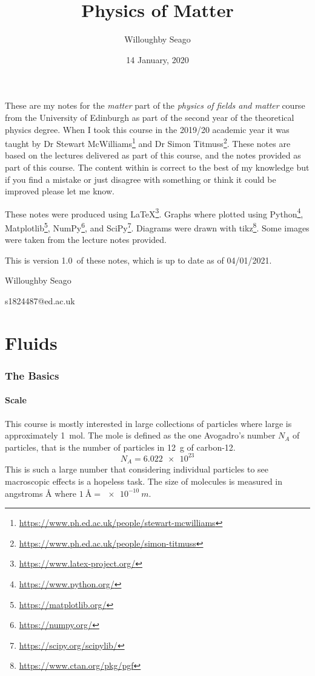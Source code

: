 \documentclass{article}
\author{Willoughby Seago}
\date{14 January, 2020}
\title{Physics of Matter}
\newcommand{\notesVersion}{1.0}
\newcommand{\notesDate}{04/01/2021}
\begin{document}
    \maketitle
    These are my notes for the \textit{matter} part of the \textit{physics of fields and matter} course from the University of Edinburgh as part of the second year of the theoretical physics degree.
    When I took this course in the 2019/20 academic year it was taught by Dr Stewart McWilliams\footnote{\url{https://www.ph.ed.ac.uk/people/stewart-mcwilliams}} and Dr Simon Titmuss\footnote{\url{https://www.ph.ed.ac.uk/people/simon-titmuss}}.
    These notes are based on the lectures delivered as part of this course, and the notes provided as part of this course.
    The content within is correct to the best of my knowledge but if you find a mistake or just disagree with something or think it could be improved please let me know.
    
    These notes were produced using \LaTeX\footnote{\url{https://www.latex-project.org/}}.
    Graphs where plotted using Python\footnote{\url{https://www.python.org/}}, Matplotlib\footnote{\url{https://matplotlib.org/}}, NumPy\footnote{\url{https://numpy.org/}}, and SciPy\footnote{\url{https://scipy.org/scipylib/}}.
    Diagrams were drawn with tikz\footnote{\url{https://www.ctan.org/pkg/pgf}}.
    Some images were taken from the lecture notes provided.
    
    This is version \notesVersion~of these notes, which is up to date as of \notesDate.
    \begin{flushright}
        Willoughby Seago
        
        s1824487@ed.ac.uk
    \end{flushright}
    \clearpage
    \tableofcontents
    \listoffigures
    \listoftables
    \clearpage
    
    \part{Fluids}
    \section{The Basics}
    \subsection{Scale}
    This course is mostly interested in large collections of particles where large is approximately \SI{1}{mol}.
    The mole is defined as the one Avogadro's number \(N_A\) of particles, that is the number of particles in \SI{12}{g} of carbon-12.
    \[N_A = \num{6.022e23}\]
    This is such a large number that considering individual particles to see macroscopic effects is a hopeless task.
    The size of molecules is measured in angstroms \si{\angstrom} where \(\SI{1}{\angstrom} = \SI{e-10}{m}\).
    
\end{document}
